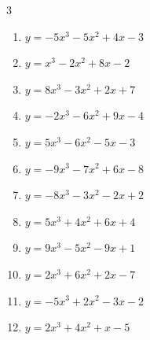 \begin{multicols}{3}
\begin{enumerate}

  \item $y=-5x^{3}-5x^{2}+4x-3$


  \item $y=x^{3}-2x^{2}+8x-2$


\columnbreak %

  \item $y=8x^{3}-3x^{2}+2x+7$


  \item $y=-2x^{3}-6x^{2}+9x-4$


  \item $y=5x^{3}-6x^{2}-5x-3$


  \item $y=-9x^{3}-7x^{2}+6x-8$


  \item $y=-8x^{3}-3x^{2}-2x+2$


  \item $y=5x^{3}+4x^{2}+6x+4$


  \item $y=9x^{3}-5x^{2}-9x+1$


  \item $y=2x^{3}+6x^{2}+2x-7$


  \item $y=-5x^{3}+2x^{2}-3x-2$


  \item $y=2x^{3}+4x^{2}+x-5$


\end{enumerate}
\end{multicols}
